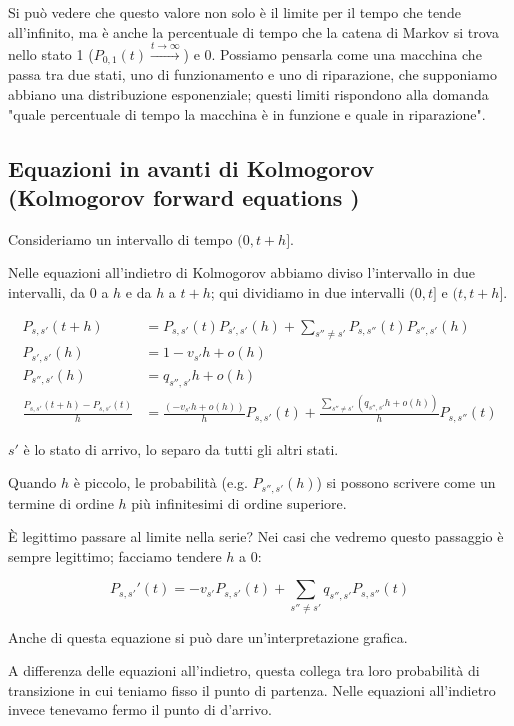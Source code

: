 \documentclass[a4paper,12pt]{book}
\begin{document}
Si può vedere che questo valore non solo è il limite per il tempo che tende all'infinito, ma è anche la percentuale di tempo che la catena di Markov si trova nello stato 1 ($ P_{0,1}(t) \xrightarrow{t \to \infty} $) e 0. Possiamo pensarla come una macchina che passa tra due stati, uno di funzionamento e uno di riparazione, che supponiamo abbiano una distribuzione esponenziale; questi limiti rispondono alla domanda "quale percentuale di tempo la macchina è in funzione e quale in riparazione". 

\subsection{Equazioni in avanti di Kolmogorov (Kolmogorov forward equations )}
Consideriamo un intervallo di tempo $ (0, t+h] $. 

Nelle equazioni all'indietro di Kolmogorov abbiamo diviso l'intervallo in due intervalli, da 0 a $ h $ e da $ h $ a $ t+h $; qui dividiamo in due intervalli $ (0, t] $ e $ (t, t+h] $. 

\begin{align*}
	P_{s,s'}(t+h) & = P_{s,s'}(t) P_{s',s'}(h) + \sum_{s'' \ne s'} P_{s,s''}(t)P_{s'',s'}(h) \\
	P_{s',s'}(h) & = 1 - v_{s'} h + o(h) \\
	P_{s'',s'}(h) & = q_{s'',s'}h + o(h) \\
	\frac{P_{s,s'}(t+h) - P_{s,s'}(t)}{h} & = \frac{(-v_{s'} h + o(h))}{h}P_{s,s'}(t) + \frac{\sum_{s'' \ne s'}(q_{s'',s'} h + o(h) ) }{h} P_{s,s''}(t)
\end{align*}

$ s' $ è lo stato di arrivo, lo separo da tutti gli altri stati. 

Quando $ h $ è piccolo, le probabilità (e.g. $ P_{s'',s'}(h) $) si possono scrivere come un termine di ordine $ h $ più infinitesimi di ordine superiore. 

È legittimo passare al limite nella serie? Nei casi che vedremo questo passaggio è sempre legittimo; facciamo tendere $ h $ a 0:

$$ P_{s,s'}'(t) = -v_{s'} P_{s,s'}(t) + \sum_{s'' \ne s' } q_{s'',s'}P_{s,s''}(t) $$

Anche di questa equazione si può dare un'interpretazione grafica. 

A differenza delle equazioni all'indietro, questa collega tra loro probabilità di transizione in cui teniamo fisso il punto di partenza. Nelle equazioni all'indietro invece tenevamo fermo il punto di d'arrivo. 
\end{document}
